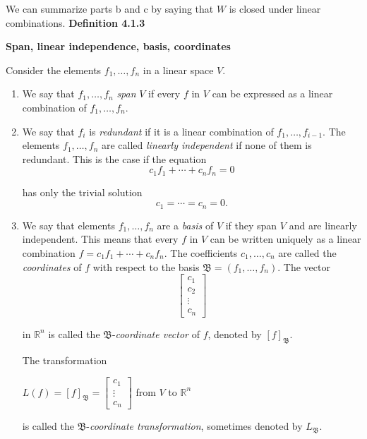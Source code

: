 \par\noindent We can summarize parts b and c by saying that $W$ is closed under linear combinations.
\textbf{Definition 4.1.3}\\
\par\noindent\textbf{Span, linear independence, basis, coordinates}
\par\noindent Consider the elements $f_{1},\ldots{},f_{n}$ in a linear space $V$.
\renewcommand{\labelenumi}{\textbf{\alph{enumi}.}}
\begin{enumerate}
\item We say that $f_{1},\ldots{},f_{n}$ \textit{span} $V$ if every $f$ in $V$ can be expressed as a linear combination of $f_{1},\ldots{},f_{n}$.
\item We say that $f_{i}$ is \textit{redundant} if it is a linear combination of $f_{1},\ldots{},f_{i-1}$. The elements $f_{1},\ldots{},f_{n}$ are called \textit{linearly independent} if none of them is redundant. This is the case if the equation
\[c_{1}f_{1}+\cdots{}+c_{n}f_{n}=0\]
\par\noindent has only the trivial solution
\[c_{1}=\cdots{}=c_{n}=0.\]
\item We say that elements $f_{1},\ldots{},f_{n}$ are a \textit{basis} of $V$ if they span $V$ and are linearly independent. This means that every $f$ in $V$ can be written uniquely as a linear combination $f=c_{1}f_{1}+\cdots{}+c_{n}f_{n}$. The coefficients $c_{1},\ldots{},c_{n}$ are called the \textit{coordinates} of $f$ with respect to the basis $\mathfrak{B}=(f_{1},\ldots{},f_{n})$. The vector
\[\left[\begin{array}{c}c_{1}\\ c_{2}\\ \vdots{}\\ c_{n}\end{array}\right]\]
\par\noindent in $\mathbb{R}^{n}$ is called the $\mathfrak{B}$-\textit{coordinate vector} of $f$, denoted by $[f]_{\mathfrak{B}}$.
\par\noindent The transformation
\par\noindent\begin{center}$\displaystyle L(f)=[f]_{\mathfrak{B}}=\left[\begin{array}{c}c_{1}\\ \vdots{}\\ c_{n}\end{array}\right]$ from $V$ to $\mathbb{R}^{n}$\end{center}
\par\noindent is called the $\mathfrak{B}$-\textit{coordinate transformation}, sometimes denoted by $L_{\mathfrak{B}}$.
\end{enumerate}
